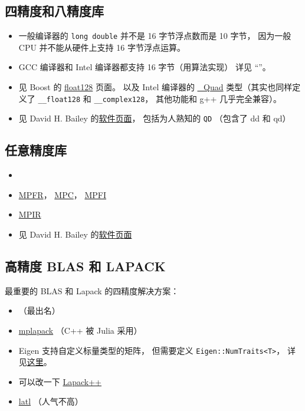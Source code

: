 
\begin{issues}
\issueDraft
\end{issues}

\subsection{四精度和八精度库}
\begin{itemize}
\item 一般编译器的 \verb|long double| 并不是 16 字节浮点数而是 10 字节， 因为一般 CPU 并不能从硬件上支持 16 字节浮点运算。
\item GCC 编译器和 Intel 编译器都支持 16 字节（用算法实现） 详见 “”。
\item 见 Boost 的 \href{https://www.boost.org/doc/libs/develop/libs/multiprecision/doc/html/boost_multiprecision/tut/floats/float128.html}{float128} 页面。 以及 Intel 编译器的 \href{https://community.intel.com/t5/Intel-C-Compiler/Quad-precision-Quad-data-type/td-p/1218636}{\_Quad} 类型（其实也同样定义了 \verb|__float128| 和 \verb|__complex128|， 其他功能和 g++ 几乎完全兼容）。
\item 见 David H. Bailey 的\href{https://www.davidhbailey.com/dhbsoftware/}{软件页面}， 包括为人熟知的 \verb|QD| （包含了 dd 和 qd）
\end{itemize}

\subsection{任意精度库}
\begin{itemize}
\item {}
\item \href{https://www.mpfr.org/}{MPFR}， \href{https://www.multiprecision.org/mpc/}{MPC}， \href{http://perso.ens-lyon.fr/nathalie.revol/software.html}{MPFI}
\item \href{https://mpir.org/downloads.html}{MPIR}
\item 见 David H. Bailey 的\href{https://www.davidhbailey.com/dhbsoftware/}{软件页面}
\end{itemize}


\subsection{高精度 BLAS 和 LAPACK}
最重要的 BLAS 和 Lapack 的四精度解决方案：
\begin{itemize}
\item {} （最出名）
\item \href{https://github.com/nakatamaho/mplapack}{mplapack} （C++ 被 Julia 采用）
\item Eigen 支持自定义标量类型的矩阵， 但需要定义 \verb|Eigen::NumTraits<T>|， 详见\href{https://eigen.tuxfamily.org/dox/TopicCustomizing_CustomScalar.html}{这里}。
\item 可以改一下 \href{https://lapackpp.sourceforge.net/html/index.html}{Lapack++}
\item \href{https://github.com/langou/latl}{latl} （人气不高）
\end{itemize}
